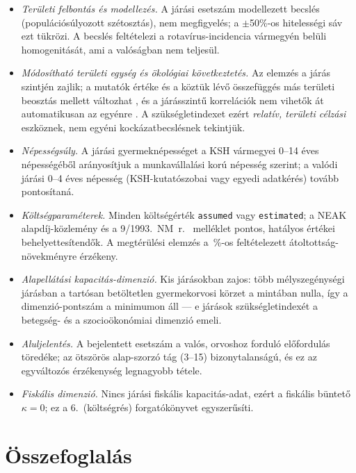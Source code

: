 \documentclass[12pt,a4paper]{article}
\begin{document}
\begin{itemize}[nosep,leftmargin=1.3em]
\item \emph{Területi felbontás és modellezés.} A járási esetszám
modellezett becslés (populációsúlyozott szétosztás), nem megfigyelés; a
$\pm$50\%-os hitelességi sáv ezt tükrözi. A becslés feltételezi a
rotavírus-incidencia vármegyén belüli homogenitását, ami a valóságban nem
teljesül.
\item \emph{Módosítható területi egység és ökológiai következtetés.} Az
elemzés a járás szintjén zajlik; a mutatók értéke és a köztük lévő
összefüggés más területi beosztás mellett változhat
\citep{openshaw1984}, és a járásszintű korrelációk nem vihetők át
automatikusan az egyénre \citep{robinson1950}. A szükségletindexet ezért
\emph{relatív, területi célzási} eszköznek, nem egyéni kockázatbecslésnek
tekintjük.
\item \emph{Népességsúly.} A járási gyermeknépességet a KSH vármegyei
0--14 éves népességéből arányosítjuk a munkavállalási korú népesség szerint;
a valódi járási 0--4 éves népesség (KSH-kutatószobai vagy egyedi adatkérés)
tovább pontosítaná.
\item \emph{Költségparaméterek.} Minden költségérték \texttt{assumed} vagy
\texttt{estimated}; a NEAK alapdíj-közlemény \citep{neak_alapdij} és a
9/1993.~NM~r.\ \citep{nm91993} melléklet pontos, hatályos értékei
behelyettesítendők. A megtérülési elemzés a \ceUptakeGain\,\%-os feltételezett
átoltottság-növekményre érzékeny.
\item \emph{Alapellátási kapacitás-dimenzió.} Kis járásokban zajos: több
mélyszegénységi járásban a tartósan betöltetlen gyermekorvosi körzet a
mintában nulla, így a dimenzió-pontszám a minimumon áll --- e járások
szükségletindexét a betegség- és a szocioökonómiai dimenzió emeli.
\item \emph{Aluljelentés.} A bejelentett esetszám a valós, orvoshoz
forduló előfordulás töredéke; az ötszörös alap-szorzó tág (3--15)
bizonytalanságú, és ez az egyváltozós érzékenység legnagyobb tétele.
\item \emph{Fiskális dimenzió.} Nincs járási fiskális kapacitás-adat, ezért
a fiskális büntető $\kappa=0$; ez a 6.~(költségrés) forgatókönyvet
egyszerűsíti.
\end{itemize}

\section{Összefoglalás}
\end{document}
